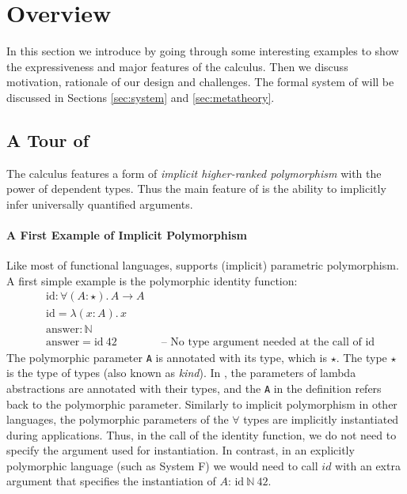 \section{Overview}

In this section we introduce \name by going through
some interesting examples to show the expressiveness and major features of the calculus.
Then we discuss motivation, rationale of our design and challenges.
The formal system of \name will be
discussed in Sections \ref{sec:system} and \ref{sec:metatheory}.

\subsection{A Tour of \name}
\label{sec:examples}

The \name calculus features a form of \emph{implicit
  higher-ranked polymorphism} with the power of dependent types. Thus the main feature of \name
is the ability to implicitly infer universally quantified arguments.

\paragraph{A First Example of Implicit Polymorphism}
Like most of functional languages, \name supports (implicit) parametric polymorphism.
A first simple example is the polymorphic identity
function:
\begin{align*}
&\mathrm{id} : \forall (A : \star).\, A \rightarrow A \\
&\mathrm{id} = \lambda (x : A).\, x \\
&\mathrm{answer} : \mathbb{N} \\
&\mathrm{answer} = \mathrm{id} ~ 42  \quad\quad\quad\quad    \text{-- No type argument needed at the call of $\mathrm{id}$}
\end{align*}
\noindent The polymorphic parameter \verb|A| is annotated with its type,
which is $\star$. The type $\star$ is the type of types (also known as
\emph{kind}). In \name, the parameters of lambda abstractions are annotated
with their types, and the \verb|A| in the definition refers back to the
polymorphic parameter. Similarly to implicit polymorphism in other languages,
the polymorphic parameters of the $\forall$ types are implicitly instantiated
during applications. Thus, in the call of the identity function, we
do not need to specify the argument used for instantiation. In contrast,
in an explicitly polymorphic language (such as System F) we would need
to call $id$ with an extra argument that specifies the instantiation of $A$:
$\mathrm{id}~\mathbb{N}~ 42$.



